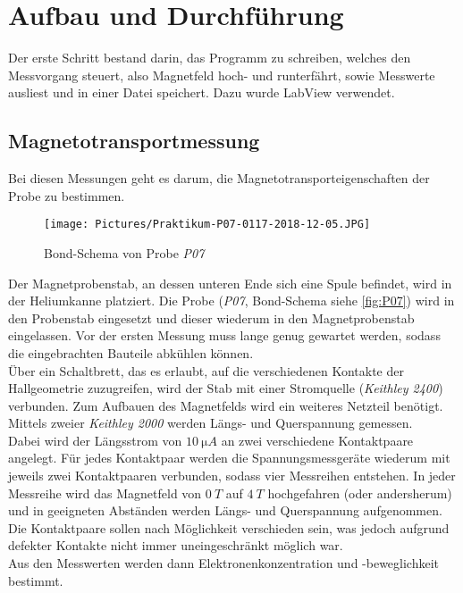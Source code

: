 \section{Aufbau und Durchführung}
Der erste Schritt bestand darin, das Programm zu schreiben, welches den Messvorgang steuert, also Magnetfeld hoch- und runterfährt, sowie Messwerte ausliest und in einer Datei speichert. Dazu wurde LabView verwendet.

\subsection{Magnetotransportmessung}\label{sec:Magnetotransport}
Bei diesen Messungen geht es darum, die Magnetotransporteigenschaften der Probe zu bestimmen.
\begin{wrapfigure}[13]{r}{7.5cm}

\texttt{[image: Pictures/Praktikum-P07-0117-2018-12-05.JPG]}
\caption{Bond-Schema von Probe \emph{P07}}
\label{fig:P07}

\end{wrapfigure}

Der Magnetprobenstab, an dessen unteren Ende sich eine Spule befindet, wird in der Heliumkanne platziert.
Die Probe (\emph{P07}, Bond-Schema siehe \autoref{fig:P07}) wird in den Probenstab eingesetzt und dieser wiederum in den Magnetprobenstab eingelassen.
Vor der ersten Messung muss lange genug gewartet werden, sodass die eingebrachten Bauteile abkühlen können.\\

Über ein Schaltbrett, das es erlaubt, auf die verschiedenen Kontakte der Hallgeometrie zuzugreifen, wird der Stab mit einer Stromquelle (\emph{Keithley 2400}) verbunden.
Zum Aufbauen des Magnetfelds wird ein weiteres Netzteil benötigt.
Mittels zweier \emph{Keithley 2000} werden Längs- und Querspannung gemessen.\\
Dabei wird der Längsstrom von $10\ \si{\micro A}$ an zwei verschiedene Kontaktpaare angelegt.
Für jedes Kontaktpaar werden die Spannungsmessgeräte wiederum mit jeweils zwei Kontaktpaaren verbunden, sodass vier Messreihen entstehen.
In jeder Messreihe wird das Magnetfeld von $0\ \si{T}$ auf $4\ \si{T}$ hochgefahren (oder andersherum) und in geeigneten Abständen werden Längs- und Querspannung aufgenommen.
Die Kontaktpaare sollen nach Möglichkeit verschieden sein, was jedoch aufgrund defekter Kontakte nicht immer uneingeschränkt möglich war.\\
Aus den Messwerten werden dann Elektronenkonzentration und -beweglichkeit bestimmt.

